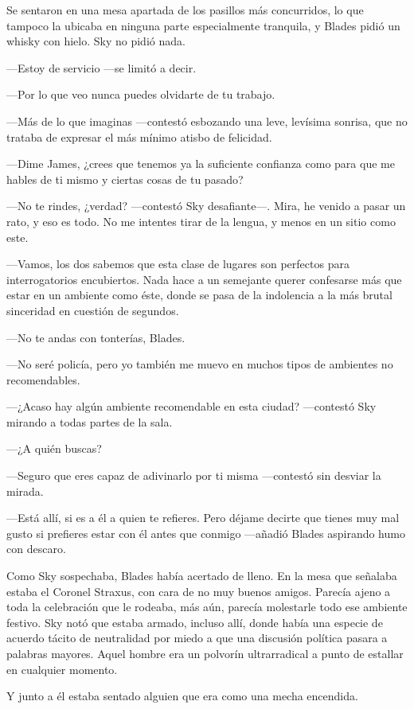 Se sentaron en una mesa apartada de los pasillos más concurridos, lo que tampoco la ubicaba en ninguna parte especialmente tranquila, y Blades pidió un whisky con hielo. Sky no pidió nada.

---Estoy de servicio ---se limitó a decir.

---Por lo que veo nunca puedes olvidarte de tu trabajo.

---Más de lo que imaginas ---contestó esbozando una leve, levísima sonrisa, que no trataba de expresar el más mínimo atisbo de felicidad.

---Dime James, ¿crees que tenemos ya la suficiente confianza como para que me hables de ti mismo y ciertas cosas de tu pasado?

---No te rindes, ¿verdad? ---contestó Sky desafiante---. Mira, he venido a pasar un rato, y eso es todo. No me intentes tirar de la lengua, y menos en un sitio como este.

---Vamos, los dos sabemos que esta clase de lugares son perfectos para interrogatorios encubiertos. Nada hace a un semejante querer confesarse más que estar en un ambiente como éste, donde se pasa de la indolencia a la más brutal sinceridad en cuestión de segundos.

---No te andas con tonterías, Blades.

---No seré policía, pero yo también me muevo en muchos tipos de ambientes no recomendables.

---¿Acaso hay algún ambiente recomendable en esta ciudad? ---contestó Sky mirando a todas partes de la sala.

---¿A quién buscas?

---Seguro que eres capaz de adivinarlo por ti misma ---contestó sin desviar la mirada.

---Está allí, si es a él a quien te refieres. Pero déjame decirte que tienes muy mal gusto si prefieres estar con él antes que conmigo ---añadió Blades aspirando humo con descaro.

Como Sky sospechaba, Blades había acertado de lleno. En la mesa que señalaba estaba el Coronel Straxus, con cara de no muy buenos amigos. Parecía ajeno a toda la celebración que le rodeaba, más aún, parecía molestarle todo ese ambiente festivo. Sky notó que estaba armado, incluso allí, donde había una especie de acuerdo tácito de neutralidad por miedo a que una discusión política pasara a palabras mayores. Aquel hombre era un polvorín ultrarradical a punto de estallar en cualquier momento.

Y junto a él estaba sentado alguien que era como una mecha encendida.

